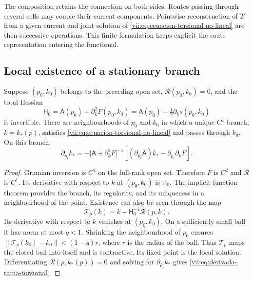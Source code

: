 The composition retains the connection on both sides. Routes passing
through several cells may couple their current components. Pointwise
reconstruction of \(T\) from a given current and joint solution of
\eqref{vii:eq:ecuacion-torsional-no-lineal} are then successive
operations. This finite formulation keeps explicit the route
representation entering the functional.

\subsection{Local existence of a stationary branch}
\label{vii:subsec:rama-torsional-local}

\begin{theorem}
\label{vii:thm:rama-torsional-local}
Suppose \((p_0,k_0)\) belongs to the preceding open set,
\(\mathcal R(p_0,k_0)=0\), and the total Hessian
\begin{equation}
 \mathsf H_0
 =\mathsf A(p_0)+\partial_k^2F(p_0,k_0)
 =\mathsf A(p_0)-\tfrac12\partial_ks(p_0,k_0)
 \label{vii:eq:hessiano-total-torsional}
\end{equation}
is invertible. There are neighbourhoods of \(p_0\) and \(k_0\)
in which a unique \(C^1\) branch, \(k=k_*(p)\), satisfies
\eqref{vii:eq:ecuacion-torsional-no-lineal} and passes through \(k_0\).
On this branch,
\begin{equation}
 \partial_{p_i}k_*
 =-\bigl[\mathsf A+\partial_k^2F\bigr]^{-1}
     \left[(\partial_{p_i}\mathsf A)k_*
                      +\partial_{p_i}\partial_kF\right].
 \label{vii:eq:derivada-rama-torsional}
\end{equation}
\end{theorem}

\begin{proof}
Gramian inversion is \(C^2\) on the full-rank open set.
Therefore \(F\) is \(C^2\) and \(\mathcal R\) is
\(C^1\). Its derivative with respect to \(k\) at \((p_0,k_0)\)
is \(\mathsf H_0\). The implicit function theorem provides
the branch, its regularity, and its uniqueness in a neighbourhood of
the point. Existence can also be seen through the map
\[
 \mathcal T_p(k)=k-\mathsf H_0^{-1}\mathcal R(p,k).
\]
Its derivative with respect to \(k\) vanishes at \((p_0,k_0)\).
On a sufficiently small ball it has norm at most
\(q<1\). Shrinking the neighbourhood of \(p_0\) ensures
\(\|\mathcal T_p(k_0)-k_0\|<(1-q)r\), where \(r\) is the
radius of the ball. Thus \(\mathcal T_p\) maps the closed ball
into itself and is contractive. Its fixed point is the local solution.
Differentiating \(\mathcal R(p,k_*(p))=0\) and solving for
\(\partial_{p_i}k_*\) gives
\eqref{vii:eq:derivada-rama-torsional}.
\end{proof}

